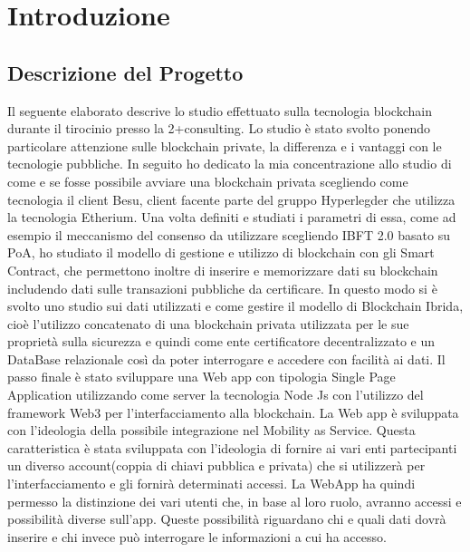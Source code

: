 \documentclass[11pt,a4paper,titlepage]{report}
\begin{document}
\begin{frontespizio}
\end{frontespizio}


\tableofcontents

\chapter{Introduzione}
\section{Descrizione del Progetto}
Il seguente elaborato descrive lo studio effettuato sulla tecnologia blockchain durante il tirocinio presso la 2+consulting. Lo studio è stato svolto ponendo particolare attenzione sulle blockchain private, la differenza e i vantaggi con le tecnologie pubbliche. In seguito ho dedicato la mia concentrazione allo studio di come e se fosse possibile avviare una blockchain privata scegliendo come tecnologia il client Besu, client facente parte del gruppo Hyperlegder che utilizza la tecnologia Etherium. Una volta definiti e studiati i parametri di essa, come ad esempio il meccanismo del consenso da utilizzare scegliendo IBFT 2.0 basato su PoA, ho studiato il modello di gestione e utilizzo di blockchain con gli Smart Contract, che permettono inoltre di inserire e memorizzare dati su blockchain includendo dati sulle transazioni pubbliche da certificare. In questo modo si è svolto uno studio sui dati utilizzati e come gestire il modello di Blockchain Ibrida, cioè l'utilizzo concatenato di una blockchain privata utilizzata per le sue proprietà sulla sicurezza e quindi come ente certificatore decentralizzato e un DataBase relazionale così da poter interrogare e accedere con facilità ai dati. Il passo finale è stato sviluppare una Web app con tipologia Single Page Application utilizzando come server la tecnologia Node Js con l'utilizzo del framework Web3 per l'interfacciamento alla blockchain. La Web app è sviluppata con l'ideologia della possibile integrazione nel Mobility as Service. Questa caratteristica è stata sviluppata con l'ideologia di fornire ai vari enti partecipanti un diverso account(coppia di chiavi pubblica e privata) che si utilizzerà per l'interfacciamento e gli fornirà determinati accessi. La WebApp ha quindi permesso la distinzione dei vari utenti che, in base al loro ruolo, avranno accessi e possibilità diverse sull'app. Queste possibilità riguardano chi e quali dati dovrà inserire e chi invece può interrogare le informazioni a cui ha accesso.
\end{document}
